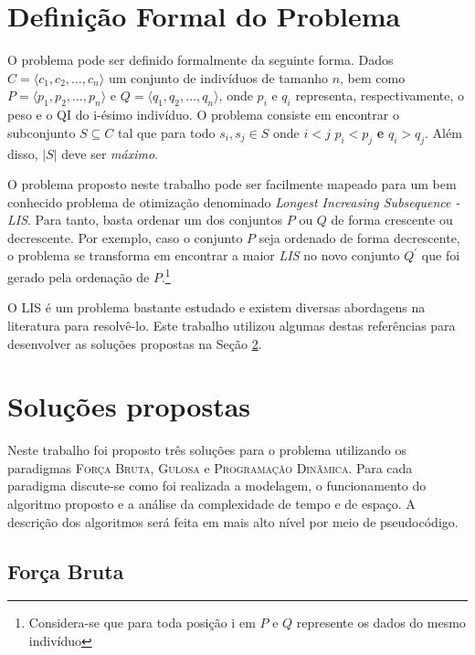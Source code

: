 \documentclass[12pt]{article}
\begin{document}
\section{Definição Formal do Problema}
\label{sec:definicao}

O problema pode ser definido formalmente da seguinte forma. Dados $C=\langle c_1, c_2, \ldots, c_n\rangle$ um conjunto de indivíduos de tamanho $n$, bem como $P=\langle p_1, p_2, \ldots, p_n\rangle$ e $Q=\langle q_1, q_2, \ldots, q_n\rangle$, onde $p_i$ e $q_i$ representa, respectivamente, o peso e o QI do i-ésimo indivíduo. O problema consiste em encontrar o subconjunto $S \subseteq C$ tal que para todo $s_i,s_j\in S $ onde $ i < j$ $ p_i < p_j$  \textbf{e} $q_i > q_j$. Além disso, $|S|$ deve ser \textit{máximo}.

O problema proposto neste trabalho pode ser facilmente mapeado para um bem conhecido problema de otimização denominado \textit{Longest Increasing Subsequence - LIS}{}\cite{knuth2013art}{}. Para tanto, basta ordenar um dos conjuntos $P$ ou $Q$ de forma crescente ou decrescente. Por exemplo, caso o conjunto $P$ seja ordenado de forma decrescente, o problema se transforma em encontrar a maior \textit{LIS} no novo conjunto $Q^{'}$ que foi gerado pela ordenação de $P$.\footnote{Considera-se que para toda posição i em $P$ e $Q$ represente os dados do mesmo indivíduo}

O LIS é um problema bastante estudado e existem diversas abordagens na literatura para resolvê-lo. Este trabalho utilizou algumas destas referências para desenvolver as soluções propostas na Seção \ref{sec:solucoes}{}.

\section{Soluções propostas}
\label{sec:solucoes}

Neste trabalho foi proposto três soluções para o problema utilizando os paradigmas \textsc{Força Bruta},  \textsc{Gulosa} e \textsc{Programação Dinâmica}{}. Para cada paradigma discute-se como foi realizada a modelagem, o funcionamento do algoritmo proposto e a análise da complexidade de tempo e de espaço. A descrição dos algoritmos será feita em mais alto nível por meio de pseudocódigo.

\subsection{Força Bruta}
\label{subsec:forca_bruta}
\end{document}

